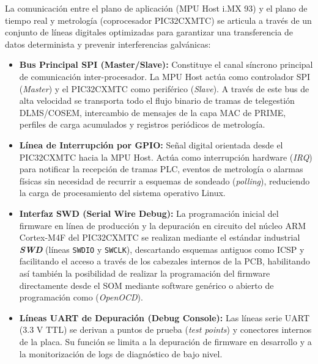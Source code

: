 La comunicación entre el plano de aplicación (MPU Host i.MX 93) y el plano de tiempo real y metrología (coprocesador PIC32CXMTC) se articula a través de un conjunto de líneas digitales optimizadas para garantizar una transferencia de datos determinista y prevenir interferencias galvánicas:

\begin{itemize}
    \item \textbf{Bus Principal SPI (Master/Slave):} Constituye el canal síncrono principal de comunicación inter-procesador. La MPU Host actúa como controlador SPI (\textit{Master}) y el PIC32CXMTC como periférico (\textit{Slave}). A través de este bus de alta velocidad se transporta todo el flujo binario de tramas de telegestión DLMS/COSEM, intercambio de mensajes de la capa MAC de PRIME, perfiles de carga acumulados y registros periódicos de metrología.

    \item \textbf{Línea de Interrupción por GPIO:} Señal digital orientada desde el PIC32CXMTC hacia la MPU Host. Actúa como interrupción hardware (\textit{IRQ}) para notificar la recepción de tramas PLC, eventos de metrología o alarmas físicas sin necesidad de recurrir a esquemas de sondeado (\textit{polling}), reduciendo la carga de procesamiento del sistema operativo Linux.

    \item \textbf{Interfaz SWD (Serial Wire Debug):} La programación inicial del firmware en línea de producción y la depuración en circuito del núcleo ARM Cortex-M4F del PIC32CXMTC se realizan mediante el estándar industrial \textit{\textbf{SWD}} (líneas \texttt{SWDIO} y \texttt{SWCLK}), descartando esquemas antiguos como ICSP y facilitando el acceso a través de los cabezales internos de la PCB, habilitando así también la posibilidad de realizar la programación del firmware directamente desde el SOM mediante software genérico o abierto de programación como (\textit{OpenOCD}).

    \item \textbf{Líneas UART de Depuración (Debug Console):} Las líneas serie UART ($3.3\text{ V}$ TTL) se derivan a puntos de prueba (\textit{test points}) y conectores internos de la placa. Su función se limita a la depuración de firmware en desarrollo y a la monitorización de logs de diagnóstico de bajo nivel.


\end{itemize}
